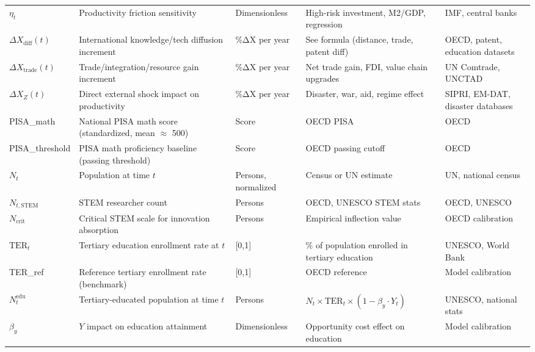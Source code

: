 \documentclass[12pt]{report}
\begin{document}
\begin{longtable}{|p{2.8cm}|p{4.3cm}|p{2.0cm}|p{3.0cm}|p{3.0cm}|}
$\eta_t$ & Productivity friction sensitivity & Dimensionless & High-risk investment, M2/GDP, regression & IMF, central banks \\
$\Delta X_{\text{diff}}(t)$ & International knowledge/tech diffusion increment & \%ΔX per year & See formula (distance, trade, patent diff) & OECD, patent, education datasets \\
$\Delta X_{\text{trade}}(t)$ & Trade/integration/resource gain increment & \%ΔX per year & Net trade gain, FDI, value chain upgrades & UN Comtrade, UNCTAD \\
$\Delta X_Z(t)$ & Direct external shock impact on productivity & \%ΔX per year & Disaster, war, aid, regime effect & SIPRI, EM-DAT, disaster databases \\
PISA\_math & National PISA math score (standardized, mean $\approx$ 500) & Score & OECD PISA & OECD \\
PISA\_threshold & PISA math proficiency baseline (passing threshold) & Score & OECD passing cutoff & OECD \\
$N_t$ & Population at time $t$ & Persons, normalized & Census or UN estimate & UN, national census \\
$N_{t,\text{STEM}}$ & STEM researcher count & Persons & OECD, UNESCO STEM stats & OECD, UNESCO \\
$N_{\text{crit}}$ & Critical STEM scale for innovation absorption & Persons & Empirical inflection value & OECD calibration \\
$\text{TER}_t$ & Tertiary education enrollment rate at $t$ & [0,1] & \% of population enrolled in tertiary education & UNESCO, World Bank \\
TER\_ref & Reference tertiary enrollment rate (benchmark) & [0,1] & OECD reference & Model calibration \\
$N_t^{\text{edu}}$ & Tertiary-educated population at time $t$ & Persons & $N_t \times \text{TER}_t \times (1 - \beta_y \cdot Y_t)$ & UNESCO, national stats \\
$\beta_y$ & $Y$ impact on education attainment & Dimensionless & Opportunity cost effect on education & Model calibration \\

\end{longtable}
\end{document}
